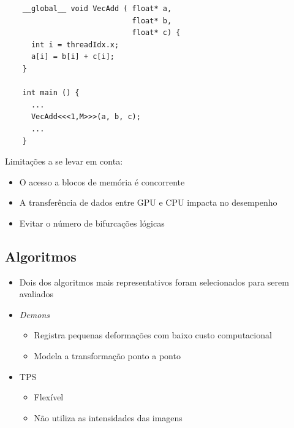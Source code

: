 \documentclass[t]{beamer}
\begin{document}
\begin{frame}[fragile]
  \begin{lstlisting}
    __global__ void VecAdd ( float* a, 
                             float* b, 
                             float* c) { 
      int i = threadIdx.x;
      a[i] = b[i] + c[i];        
    }
                              
    int main () {               
      ...                       
      VecAdd<<<1,M>>>(a, b, c);
      ...                       
    }                                 
  \end{lstlisting}
\end{frame}

\begin{frame}
  Limitações a se levar em conta:
  \begin{itemize}
    \item O acesso a blocos de memória é concorrente
    \item A transferência de dados entre GPU e CPU impacta no desempenho
    \item Evitar o número de bifurcações lógicas
  \end{itemize}
\end{frame}

\subsection{Algoritmos}

\begin{frame}
  \begin{itemize}
    \item Dois dos algoritmos mais representativos foram selecionados para serem avaliados
    \item \textit{Demons}
      \begin{itemize}
        \item Registra pequenas deformações com baixo custo computacional
        \item Modela a transformação ponto a ponto
      \end{itemize}
    \item TPS 
      \begin{itemize}
        \item Flexível
        \item Não utiliza as intensidades das imagens
      \end{itemize}
  \end{itemize}
\end{frame}
\end{document}
